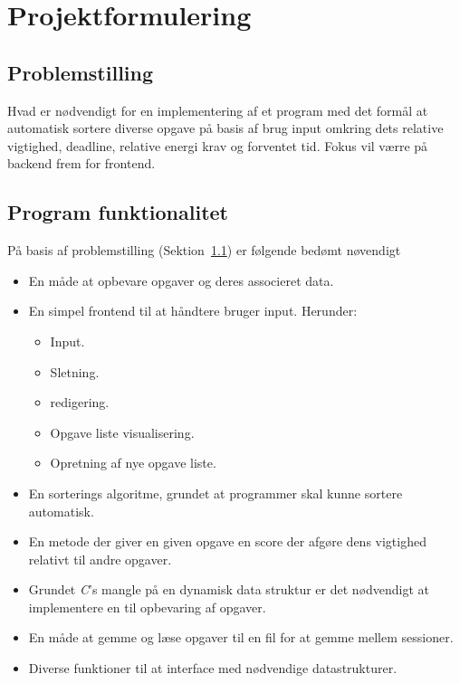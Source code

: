\section{Projektformulering}
\label{sec:projekformulering}

\subsection{Problemstilling}
\label{sec:problemstiling}
Hvad er n{\o}dvendigt for en implementering af et program med det form{\aa}l at automatisk sortere diverse opgave p{\aa} basis af brug input omkring dets relative vigtighed, deadline, relative energi krav og forventet tid. Fokus vil v{\ae}rre p{\aa} backend frem for frontend. 

\subsection{Program funktionalitet}
\label{sec:program funktionalitet}
P{\aa} basis af problemstilling (Sektion~\ref{sec:problemstiling}) er f{\o}lgende bed{\o}mt n{\o}vendigt
\begin{itemize}
    \item En m{\aa}de at opbevare opgaver og deres associeret data.
    \item En simpel frontend til at h{\aa}ndtere bruger input. Herunder:
    \begin{itemize}
        \item Input.
        \item Sletning.
        \item redigering.
        \item Opgave liste visualisering.
        \item Opretning af nye opgave liste. 
    \end{itemize}
    \item En sorterings algoritme, grundet at programmer skal kunne sortere automatisk.
    \item En metode der giver en given opgave en score der afg{\o}re dens vigtighed relativt til andre opgaver. 
    \item Grundet \textit{C}'s mangle p{\aa} en dynamisk data struktur er det n{\o}dvendigt at implementere en til opbevaring af opgaver.
    \item En m{\aa}de at gemme og l{\ae}se opgaver til en fil for at gemme mellem sessioner. 
    \item Diverse funktioner til at interface med n{\o}dvendige datastrukturer. 
\end{itemize}